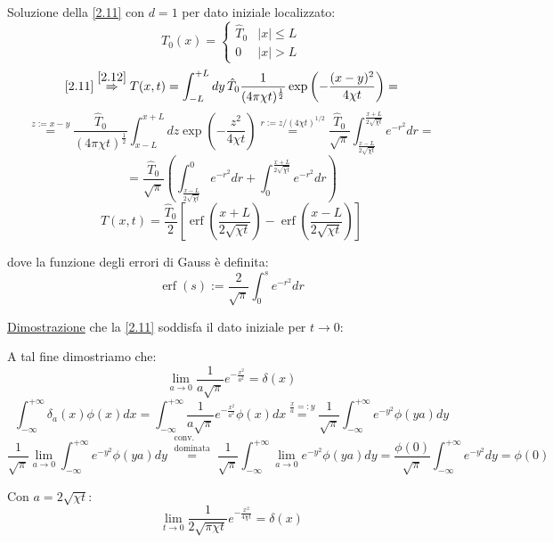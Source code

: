 \documentclass[a4paper,11pt]{report}
\begin{document}
Soluzione della \eqref{2.11} con $d=1$ per dato iniziale localizzato:
\[
T_0(x)=\left\{\begin{matrix}
 \hat{T}_0 & |x|\leq L \\ 
 0 & |x| > L
\end{matrix}\right.
\]
\[
\eqref{2.11}\overset{\eqref{2.12}}{\Rightarrow} T(x,t)=\int_{-L}^{+L}dy \, \hat{T}_0 \frac{1}{(4\pi\chi t)^\frac{1}{2}}\exp{\left(-\frac{(x-y)^2}{4\chi t}\right)}=
\]
\[
\overset{z:=x-y}{=}\frac{\hat{T}_0}{(4\pi\chi t)^\frac{1}{2}}\int_{x-L}^{x+L}dz \exp{\left(-\frac{z^2}{4\chi t}\right)}\overset{r:={z}/{(4\chi t)^{1/2}}}{=}\frac{\hat{T}_0}{\sqrt{\pi}}\int_{\frac{x-L}{2\sqrt{\chi t}}}^{\frac{x+L}{2\sqrt{\chi t}}} e^{-r^2}dr=
\]
\[
=\frac{\hat{T}_0}{\sqrt{\pi}}\left(\int_{\frac{x-L}{2\sqrt{\chi t}}}^{0}e^{-r^2}dr + \int_0^{\frac{x+L}{2\sqrt{\chi t}}}e^{-r^2}dr\right)
\]
\begin{equation}
T(x,t)=\frac{\hat{T}_0}{2}\left[\operatorname{erf}\left(\frac{x+L}{2\sqrt{\chi t}}\right)-\operatorname{erf}\left(\frac{x-L}{2\sqrt{\chi t}}\right)\right]
\end{equation}

dove la funzione degli errori di Gauss \`e definita:
\begin{equation}
\operatorname{erf}(s):=\frac{2}{\sqrt{\pi}}\int_0^s e^{-r^2}dr
\end{equation}


\medskip

\underline{Dimostrazione} che la \eqref{2.11} soddisfa il dato iniziale per $t\rightarrow 0$:

A tal fine dimostriamo che:
\[
\lim_{a \to 0} \frac{1}{a\sqrt{\pi}}e^{-\frac{x^2}{a^2}}=\delta(x)
\]
\[
\int_{-\infty}^{+\infty}\delta_a(x)\phi(x)dx=\int_{-\infty}^{+\infty}\frac{1}{a\sqrt{\pi}}e^{-\frac{x^2}{a^2}}\phi(x)dx\overset{\frac{x}{a}=:y}{=}\frac{1}{\sqrt{\pi}}\int_{-\infty}^{+\infty}e^{-y^2}\phi(ya)dy
\]
\[
\frac{1}{\sqrt{\pi}}\lim_{a\to 0}\int_{-\infty}^{+\infty}e^{-y^2}\phi(ya)dy\overset{\substack{\text{conv.}\\ \text{dominata}}}{=}
\frac{1}{\sqrt{\pi}}\int_{-\infty}^{+\infty}\lim_{a\to 0}e^{-y^2}\phi(ya)dy=\frac{\phi(0)}{\sqrt{\pi}}\int_{-\infty}^{+\infty}e^{-y^2}dy=\phi(0)
\]

Con $a=2\sqrt{\chi t}:$
\begin{equation}
\lim_{t \to 0}\frac{1}{2\sqrt{\pi\chi t}}e^{-\frac{x^2}{4\chi t}}=\delta(x)
\end{equation}
\end{document}
